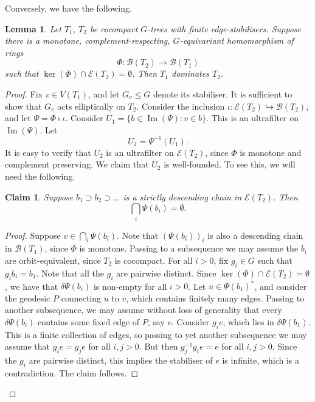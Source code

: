 \documentclass[11pt,a4paper]{amsart}
\newcommand{\into}{\hookrightarrow}
\newtheorem{lemma}[theorem]{Lemma}
\newtheorem{claim}[theorem]{Claim}
\theoremstyle{definition}
\newcommand{\br}{{\mathscr{B}}}
\begin{document}

Conversely, we have the following. 

\begin{lemma}\label{lem:br-map-gives-gmap}
    Let $T_1$, $T_2$ be cocompact $G$-trees with finite edge-stabilisers. Suppose there is a monotone, complement-respecting, $G$-equivariant homomorphism of rings 
    $$
    \Phi : \br(T_2) \to \br(T_1)
    $$
    such that
    $
    \ker (\Phi) \cap \mathscr E(T_2) = \emptyset
    $. 
    Then $T_1$ dominates $T_2$.  
\end{lemma}

\begin{proof}
    Fix $v \in V(T_1)$, and let $G_v \leq G$ denote its stabiliser. It is sufficient to show that $G_v$ acts elliptically on $T_2$. Consider the inclusion $\iota : \mathscr E(T_2) \into \br(T_2)$, and let $\Psi = \Phi \circ \iota$. Consider 
    $
    U_1 = \{b \in \operatorname{Im}(\Psi) : v \in b\}
    $. 
    This is an ultrafilter on $\operatorname{Im}(\Psi)$. Let 
    $$
    U_2 = \Psi^{-1}(U_1).
    $$
    It is easy to verify that $U_2$ is an ultrafilter on $\mathscr E(T_2)$, since $\Phi$ is monotone and complement preserving. We claim that $U_2$ is well-founded. To see this, we will need the following. 

    \begin{claim}\label{claim:dcc}
        Suppose $b_1 \supset b_2 \supset \ldots$ is a strictly descending chain in $\mathscr E(T_2)$. Then
        $$
        \bigcap_i \Psi(b_i) = \emptyset.
        $$
    \end{claim}

    \begin{proof}
        Suppose $v \in \bigcap_i \Psi(b_i)$. Note that $(\Psi(b_i))_i$ is also a descending chain in $\br(T_1)$, since $\Phi$ is monotone. Passing to a subsequence we may assume the $b_i$ are orbit-equivalent, since $T_2$ is  cocompact. 
        For all $i > 0$, fix $g_i \in G$ such that $g_i b_i = b_1$. Note that all the $g_i$ are pairwise distinct. 
        Since $\ker (\Phi) \cap \mathscr E(T_2) = \emptyset$, we have that $\delta \Psi(b_i)$ is non-empty for all $i > 0$. Let $u \in  \Psi(b_1)^\ast$, and consider the geodesic $P$ connecting $u$ to $v$, which contains finitely many edges. Passing to another subsequence, we may assume without loss of generality that every $\delta \Psi(b_i)$ contains some fixed edge of $P$, say $e$.  
        Consider $g_i e$, which lies in $\delta \Psi(b_1)$. This is a finite collection of edges, so passing to yet another subsequence we may assume that $g_ie = g_je$ for all $i, j > 0$. But then $g_j^{-1}g_i e = e$ for all $i, j > 0$. Since the $g_i$ are pairwise distinct, this implies the stabiliser of $e$ is infinite, which is a contradiction. The claim follows. 
    \end{proof}


\end{proof}
\end{document}

